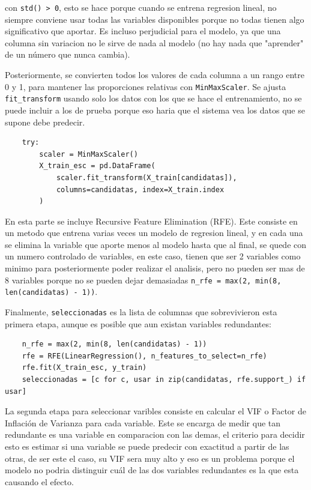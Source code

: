 con \texttt{std() > 0}, esto se hace porque cuando se entrena regresion lineal, no siempre conviene usar todas las variables disponibles porque no todas tienen algo significativo que aportar. Es incluso perjudicial para el modelo, ya que una columna sin variacion no le sirve de nada al modelo (no hay nada que "aprender" de un número que nunca cambia).

Posteriormente, se convierten todos los valores de cada columna a un rango entre 0 y 1, para mantener las proporciones relativas con \texttt{MinMaxScaler}. Se ajusta \texttt{fit\_transform} usando solo los datos con los que se hace el entrenamiento, no se puede incluir a los de prueba porque eso haria que el sistema vea los datos que se supone debe predecir.  

\begin{verbatim}
    try:
        scaler = MinMaxScaler()
        X_train_esc = pd.DataFrame(
            scaler.fit_transform(X_train[candidatas]),
            columns=candidatas, index=X_train.index
        )
\end{verbatim}

En esta parte se incluye Recursive Feature Elimination (RFE). Este consiste en un metodo que entrena varias veces un modelo de regresion lineal, y en cada una se elimina la variable que aporte menos al modelo hasta que al final, se quede con un numero controlado de variables, en este caso, tienen que ser 2 variables como minimo para posteriormente poder realizar el analisis, pero no pueden ser mas de 8 variables porque no se pueden dejar demasiadas \texttt{n\_rfe = max(2, min(8, len(candidatas) - 1))}.

Finalmente, \texttt{seleccionadas} es la lista de columnas que sobrevivieron esta primera etapa, aunque es posible que aun existan variables redundantes:

\begin{verbatim}
    n_rfe = max(2, min(8, len(candidatas) - 1))
    rfe = RFE(LinearRegression(), n_features_to_select=n_rfe)
    rfe.fit(X_train_esc, y_train)
    seleccionadas = [c for c, usar in zip(candidatas, rfe.support_) if usar]
\end{verbatim}

La segunda etapa para seleccionar varibles consiste en calcular el VIF o Factor de Inflación de Varianza para cada variable. Este se encarga de medir que tan redundante es una variable en comparacion con las demas, el criterio para decidir esto es estimar si una variable se puede predecir con exactitud a partir de las otras, de ser este el caso, su VIF sera muy alto y eso es un problema porque el modelo no podria distinguir cuál de las dos variables redundantes es la que esta causando el efecto.

